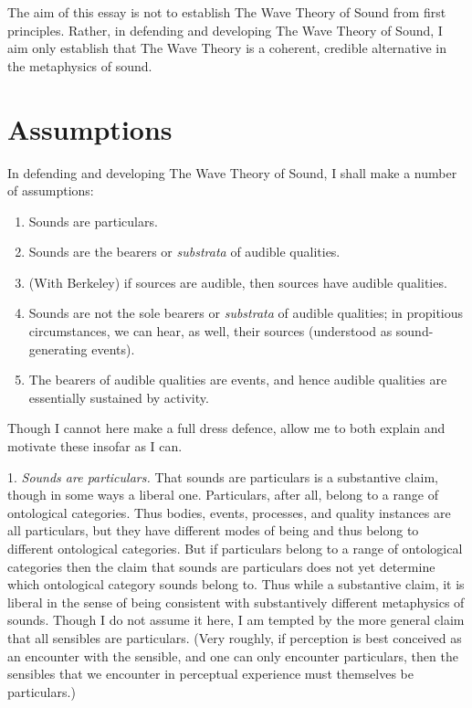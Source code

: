 \documentclass[12pt]{article}
\begin{document}
The aim of this essay is not to establish The Wave Theory of Sound from first principles. Rather, in defending and developing The Wave Theory of Sound, I aim only establish that The Wave Theory is a coherent, credible alternative in the metaphysics of sound. 


\section{Assumptions} %
\label{sec:section_name}

In defending and developing The Wave Theory of Sound, I shall make a number of assumptions:
\begin{enumerate}
	\item Sounds are particulars.
	\item Sounds are the bearers or \emph{substrata} of audible qualities.
	\item (With Berkeley) if sources are audible, then sources have audible qualities.
	\item Sounds are not the sole bearers or \emph{substrata} of audible qualities; in propitious circumstances, we can hear, as well, their sources (understood as sound-generating events).
	\item The bearers of audible qualities are events, and hence audible qualities are essentially sustained by activity.
\end{enumerate}
Though I cannot here make a full dress defence, allow me to both explain and motivate these insofar as I can.

1. \emph{Sounds are particulars.} That sounds are particulars is a substantive claim, though in some ways a liberal one. Particulars, after all, belong to a range of ontological categories. Thus bodies, events, processes, and quality instances are all particulars, but they have different modes of being and thus belong to different ontological categories. But if particulars belong to a range of ontological categories then the claim that sounds are particulars does not yet determine which ontological category sounds belong to. Thus while a substantive claim, it is liberal in the sense of being consistent with substantively different metaphysics of sounds. Though I do not assume it here, I am tempted by the more general claim that all sensibles are particulars. (Very roughly, if perception is best conceived as an encounter with the sensible, and one can only encounter particulars, then the sensibles that we encounter in perceptual experience must themselves be particulars.)
\end{document}
